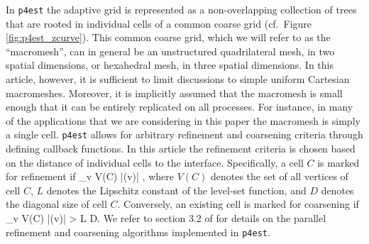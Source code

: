 In \texttt{p4est} the adaptive grid is represented as a non-overlapping collection of trees that are rooted in individual cells of a common coarse grid (cf.\ Figure \ref{fig:p4est_zcurve}). This common coarse grid, which we will refer to as the ``macromesh'', can in general be an unstructured quadrilateral mesh, in two spatial dimensions, or hexahedral mesh, in three spatial dimensions.
In this article, however, it is sufficient to limit discussions to simple
uniform Cartesian macromeshes.
Moreover, it is implicitly assumed that the macromesh is small enough that it
can be entirely replicated on all processes.
For instance, in many of the applications that we are considering in this paper the macromesh is simply a single cell.
\texttt{p4est} allows for arbitrary refinement and coarsening criteria through defining callback functions.
In this article the refinement criteria is chosen based on the distance of individual cells to the interface.
Specifically, a cell $C$ is marked for refinement if
\be
\min_{v \in V(C)} |\phi (v)| \le {},
\label{eq:refine}
\ee
where $V(C)$ denotes the set of all vertices of cell $C$, $L$ denotes the
Lipschitz constant of the level-set function, and $D$ denotes the diagonal size
of cell $C$.
Conversely, an existing cell is marked for coarsening if
\be
\min_{v \in V(C)} |\phi (v)| > L D.
\label{eq:coarsen}
\ee
We refer to section 3.2 of
\cite{Burstedde;Wilcox;Ghattas:11:p4est:-Scalable-Algo} for details on the
parallel refinement and coarsening algorithms implemented in \texttt{p4est}.

